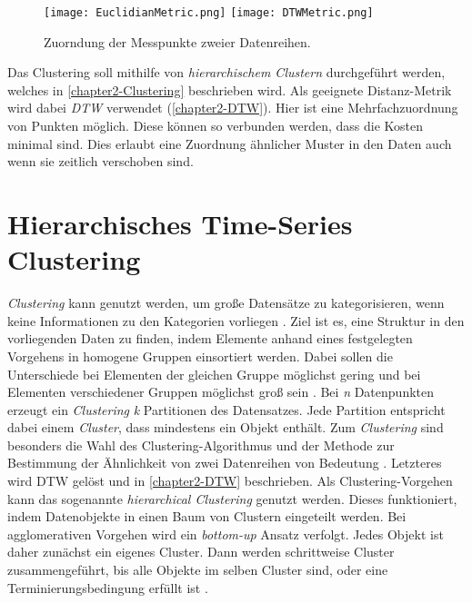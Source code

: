 \begin{figure}[ht]
    \begin{center}
    \texttt{[image: EuclidianMetric.png]}
    \texttt{[image: DTWMetric.png]}
    \end{center}
    \caption{Zuorndung der Messpunkte zweier Datenreihen.}
    \label{fig:MetricComparison}
\end{figure}

Das Clustering soll mithilfe von \emph{hierarchischem Clustern} durchgeführt werden,
welches in \autoref{chapter2-Clustering} beschrieben wird.
Als geeignete Distanz-Metrik wird dabei \emph{\ac{DTW}} verwendet (\autoref{chapter2-DTW}).
Hier ist eine Mehrfachzuordnung von Punkten möglich.
Diese können so verbunden werden, dass die Kosten minimal sind.
Dies erlaubt eine Zuordnung ähnlicher Muster in den Daten auch wenn sie zeitlich verschoben sind.

\section{Hierarchisches Time-Series Clustering}
\label{chapter2-Clustering}
\emph{Clustering} kann genutzt werden, um große Datensätze zu kategorisieren,
wenn keine Informationen zu den Kategorien vorliegen \citep{aghabozorgi_time-series_2015}.
Ziel ist es, eine Struktur in den vorliegenden Daten zu finden,
indem Elemente anhand eines festgelegten Vorgehens in homogene Gruppen einsortiert werden.
Dabei sollen die Unterschiede bei Elementen der gleichen Gruppe möglichst gering
und bei Elementen verschiedener Gruppen möglichst groß sein \citep{aghabozorgi_time-series_2015, warren_liao_clustering_2005}.
Bei \emph{n} Datenpunkten erzeugt ein \emph{Clustering} \emph{k} Partitionen des Datensatzes.
Jede Partition entspricht dabei einem \emph{Cluster}, dass mindestens ein Objekt enthält.
Zum \emph{Clustering} sind besonders die Wahl des Clustering-Algorithmus
und der Methode zur Bestimmung der Ähnlichkeit von zwei Datenreihen von Bedeutung \citep{warren_liao_clustering_2005}.
Letzteres wird \ac{DTW} gelöst und in \autoref{chapter2-DTW} beschrieben.
Als Clustering-Vorgehen kann das sogenannte \emph{hierarchical Clustering} genutzt werden.
Dieses funktioniert, indem Datenobjekte in einen Baum von Clustern eingeteilt werden.
Bei agglomerativen Vorgehen wird ein \emph{bottom-up} Ansatz verfolgt.
Jedes Objekt ist daher zunächst ein eigenes Cluster.
Dann werden schrittweise Cluster zusammengeführt,
bis alle Objekte im selben Cluster sind, oder eine Terminierungsbedingung erfüllt ist \citep{warren_liao_clustering_2005}.

